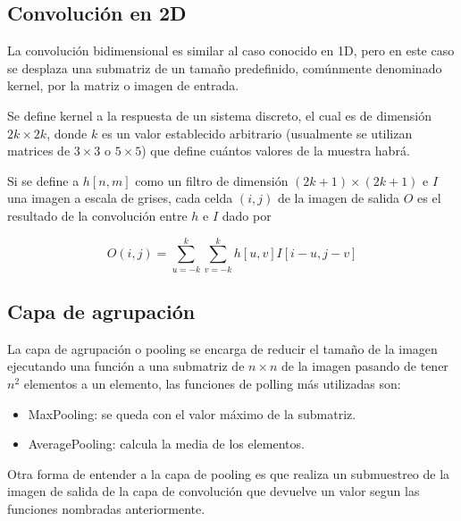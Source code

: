 \subsection{Convolución en 2D}

La convolución bidimensional es similar al caso conocido en 1D, pero en este caso se desplaza una submatriz de un tamaño predefinido, comúnmente denominado kernel, por la matriz o imagen de entrada.

Se define kernel a la respuesta de un sistema discreto, el cual es de dimensión $2k \times 2k$, donde $k$ es un
valor establecido arbitrario (usualmente se utilizan matrices de $3 \times 3$ o $5 \times 5$) que define cuántos valores de la muestra habrá.

Si se define a $h[n,m]$ como un filtro de dimensión $(2k + 1) \times (2k + 1)$ e $I$ una imagen a escala de grises, cada celda $(i,j)$ de la imagen de salida $O$ es el
resultado de la convolución entre $h$ e $I$ dado por

\begin{equation}
    O(i,j)= \sum_{u=-k}^{k} \sum_{v=-k}^{k} h[u,v]I[i-u,j-v]
\end{equation}


\subsection{Capa de agrupación}

La capa de agrupación o pooling se encarga de reducir el tamaño de la imagen ejecutando una función a una submatriz de $n \times n$ de la imagen pasando de tener $n^2$ elementos a un elemento, las funciones de polling más utilizadas son:

\begin{itemize}
    \item MaxPooling: se queda con el valor máximo de la submatriz.
    \item AveragePooling: calcula la media de los elementos.
\end{itemize}

Otra forma de entender a la capa de pooling es que realiza un submuestreo de la imagen de salida de la capa de convolución que devuelve un valor segun las funciones nombradas anteriormente.

